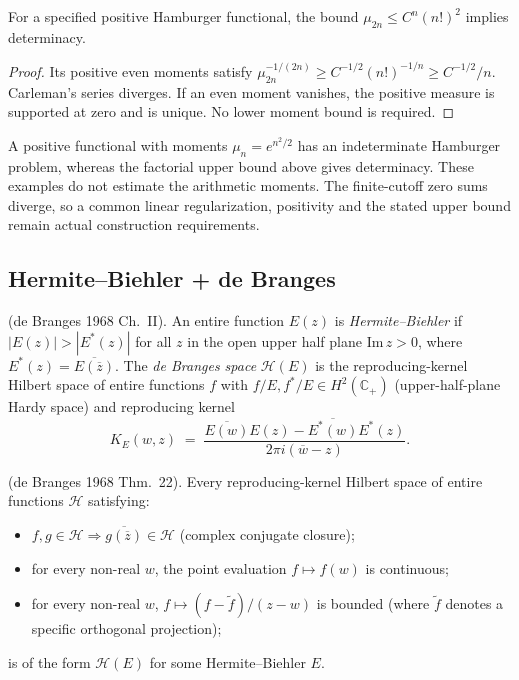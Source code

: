 \begin{proposition}
\label{v4-arith:hpvbconv:prop:carleman-insufficient}
For a specified positive Hamburger functional, the bound
\(\mu_{2n}\leq C^n(n!)^2\) implies determinacy.
\end{proposition}
\begin{proof}
Its positive even moments satisfy
\(\mu_{2n}^{-1/(2n)}\geq C^{-1/2}(n!)^{-1/n}
\geq C^{-1/2}/n\). Carleman's series diverges. If an even
moment vanishes, the positive measure is supported at zero and is
unique. No lower moment bound is required.
\end{proof}
\begin{remark}
\label{v4-arith:hpvbconv:rem:stieltjes}
A positive functional with moments \(\mu_n=e^{n^2/2}\) has an
indeterminate Hamburger problem, whereas the factorial upper bound
above gives determinacy. These examples do not estimate the arithmetic
moments. The finite-cutoff zero sums diverge, so a common linear
regularization, positivity and the stated upper bound remain actual
construction requirements.
\end{remark}

\subsection{Hermite--Biehler + de Branges}
\label{v4-arith:hpvbconv:hermite-biehler}

\begin{definition}
\label{v4-arith:hpvbconv:def:hermite-biehler}
(de Branges 1968 Ch.~II). An entire function
\(E(z)\) is \emph{Hermite--Biehler} if
\(|E(z)|>|E^{*}(z)|\) for all \(z\) in the open upper half plane
\(\mathrm{Im}\,z>0\), where \(E^{*}(z)=\overline{E(\overline{z})}\).
The \emph{de Branges space} \(\mathcal{H}(E)\) is the reproducing-kernel
Hilbert space of entire functions \(f\) with \(f/E,f^{*}/E\in H^{2}(\mathbb{C}_{+})\)
(upper-half-plane Hardy space) and reproducing kernel
\begin{equation}
K_{E}(w,z)\;=\;\frac{\overline{E(w)}E(z)-\overline{E^{*}(w)}E^{*}(z)}{2\pi i(\overline{w}-z)}.
\end{equation}
\end{definition}

\begin{theorem}
\label{v4-arith:hpvbconv:thm:de-branges-structure}
(de Branges 1968 Thm.~22). Every
reproducing-kernel Hilbert space of entire functions \(\mathcal{H}\)
satisfying:
\begin{itemize}
\item \(f,g\in\mathcal{H}\Rightarrow\overline{g(\overline{z})}\in\mathcal{H}\)
(complex conjugate closure);
\item for every non-real \(w\), the point evaluation \(f\mapsto f(w)\) is
continuous;
\item for every non-real \(w\),
\(f\mapsto(f-\tilde{f})/(z-w)\) is bounded (where \(\tilde{f}\) denotes a
specific orthogonal projection);
\end{itemize}
is of the form \(\mathcal{H}(E)\) for some Hermite--Biehler \(E\).
\end{theorem}

